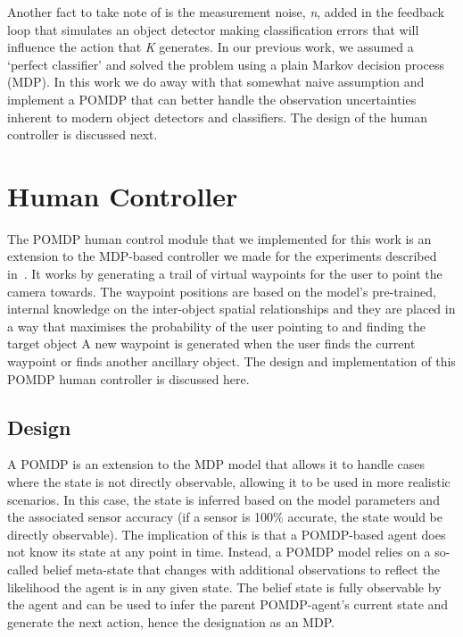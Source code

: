 \documentclass[runningheads]{llncs}
\begin{document}
Another fact to take note of is the measurement noise, \emph{n}, added in the feedback loop that simulates an object detector making classification errors that will influence the action that \emph{K} generates. 
In our previous work, we assumed a `perfect classifier' and solved the problem using a plain Markov decision process (MDP). 
In this work we do away with that somewhat naive assumption and implement a POMDP that can better handle the observation uncertainties inherent to modern object detectors and classifiers. 
The design of the human controller is discussed next. 

\section{Human Controller}\label{sec:human-controller}

The POMDP human control module that we implemented for this work is an extension to the MDP-based controller we made for the experiments described in~\cite{lock2019active}.
It works by generating a trail of virtual waypoints for the user to point the camera towards.
The waypoint positions are based on the model's pre-trained, internal knowledge on the inter-object spatial relationships and they are placed in a way that maximises the probability of the user pointing to and finding the target object
A new waypoint is generated when the user finds the current waypoint or finds another ancillary object.
The design and implementation of this POMDP human controller is discussed here.

\subsection{Design}

A POMDP is an extension to the MDP model that allows it to handle cases where the state is not directly observable, allowing it to be used in more realistic scenarios. 
In this case, the state is inferred based on the model parameters and the associated sensor accuracy (if a sensor is 100\% accurate, the state would be directly observable).
The implication of this is that a POMDP-based agent does not know its state at any point in time.
Instead, a POMDP model relies on a so-called belief meta-state that changes with additional observations to reflect the likelihood the agent is in any given state.
The belief state is fully observable by the agent and can be used to infer the parent POMDP-agent's current state and generate the next action, hence the designation as an MDP.\@
\end{document}
